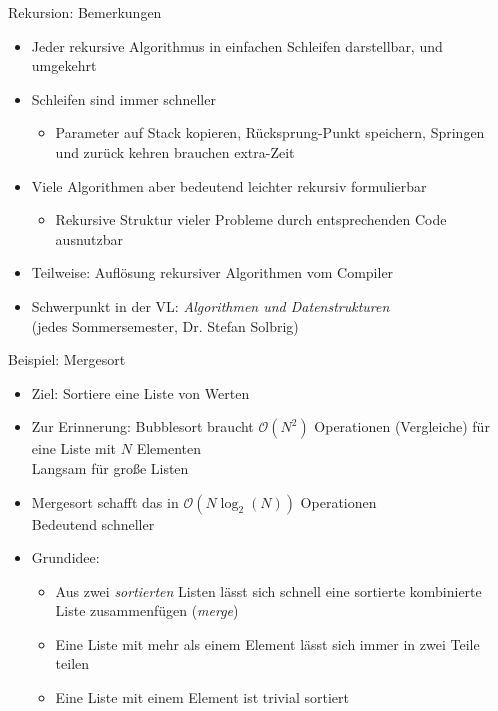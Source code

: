 \begin{frame}{Rekursion: Bemerkungen}
%
\begin{itemize}
\item Jeder rekursive Algorithmus in einfachen Schleifen darstellbar, und umgekehrt
\item Schleifen sind immer schneller
	\begin{itemize}
	\item Parameter auf Stack kopieren, Rücksprung-Punkt speichern, Springen und zurück kehren brauchen extra-Zeit
	\end{itemize}
\item Viele Algorithmen aber bedeutend leichter rekursiv formulierbar
	\begin{itemize}
	\item Rekursive Struktur vieler Probleme durch entsprechenden Code ausnutzbar
	\end{itemize}
\item Teilweise: Auflösung rekursiver Algorithmen vom Compiler
\item Schwerpunkt in der VL: \emph{Algorithmen und Datenstrukturen}\\
	(jedes Sommersemester, Dr. Stefan Solbrig)
\end{itemize}
%
\end{frame}


\begin{frame}{Beispiel: Mergesort}
%
\begin{itemize}
\item Ziel: Sortiere eine Liste von Werten
\item Zur Erinnerung: Bubblesort braucht $\mathcal{O}(N^2)$ Operationen (Vergleiche) für eine Liste mit $N$ Elementen\\
	\Thus Langsam für große Listen
\item Mergesort schafft das in $\mathcal{O}(N \log_2(N))$ Operationen\\
	\Thus Bedeutend schneller
\item Grundidee: 
	\begin{itemize}
	\item Aus zwei \emph{sortierten} Listen lässt sich schnell eine sortierte kombinierte Liste zusammenfügen (\emph{merge})
	\item Eine Liste mit mehr als einem Element lässt sich immer in zwei Teile teilen
	\item Eine Liste mit einem Element ist trivial sortiert
	\end{itemize}
\end{itemize}
%
\end{frame}

